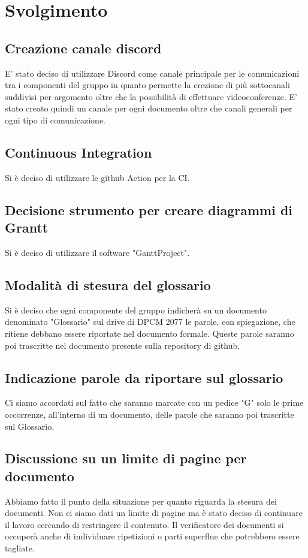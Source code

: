 \section*{Svolgimento}
\subsection*{Creazione canale discord}
E' stato deciso di utilizzare Discord come canale principale per le comunicazioni tra i componenti del gruppo in quanto permette la crezione di più sottocanali suddivisi per argomento oltre che la possibilità di effettuare videoconferenze. E' stato creato quindi un canale per ogni documento oltre che canali generali per ogni tipo di comunicazione.

\subsection*{Continuous Integration}
Si è deciso di utilizzare le github Action per la CI.

\subsection*{Decisione strumento per creare diagrammi di Grantt}
Si è deciso di utilizzare il software "GanttProject".
			
\subsection*{Modalità di stesura del glossario}
Si è deciso che ogni componente del gruppo indicherà su un documento denominato "Glossario" sul drive di DPCM 2077 le parole, con spiegazione, che ritiene debbano essere riportate nel documento formale. 
Queste parole saranno poi trascritte nel documento presente sulla repository di github.

\subsection*{Indicazione parole da riportare sul glossario}
Ci siamo accordati sul fatto che saranno marcate con un pedice "G" solo le prime occorrenze, all'interno di un documento, delle parole che saranno poi trascritte sul Glossario.

\subsection*{Discussione su un limite di pagine per documento}
Abbiamo fatto il punto della situazione per quanto riguarda la stesura dei documenti. Non ci siamo dati un limite di pagine ma è stato deciso di continuare il lavoro cercando di restringere il contenuto. Il verificatore dei documenti si occuperà anche di individuare ripetizioni o parti superflue che potrebbero essere tagliate.

